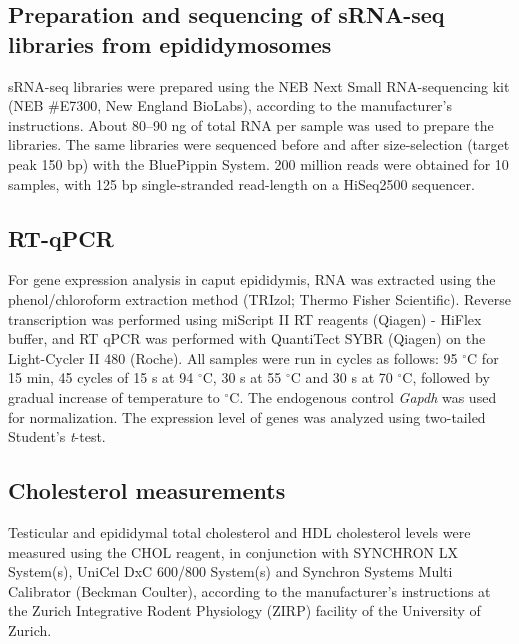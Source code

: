 \documentclass[12pt,twoside]{reedthesis}
\begin{document}
\hypertarget{preparation-and-sequencing-of-srna-seq-libraries-from-epididymosomes}{%
\subsection{Preparation and sequencing of sRNA-seq libraries from epididymosomes}\label{preparation-and-sequencing-of-srna-seq-libraries-from-epididymosomes}}

sRNA-seq libraries were prepared using the NEB Next Small RNA-sequencing
kit (NEB \#E7300, New England BioLabs), according to the manufacturer's
instructions. About 80--90 ng of total RNA per sample was used to
prepare the libraries. The same libraries were sequenced before and
after size-selection (target peak 150 bp) with the BluePippin System.
200 million reads were obtained for 10 samples, with 125 bp
single-stranded read-length on a HiSeq2500 sequencer.

\hypertarget{rt-qpcr}{%
\subsection{RT-qPCR}\label{rt-qpcr}}

For gene expression analysis in caput epididymis, RNA was extracted
using the phenol/chloroform extraction method (TRIzol; Thermo Fisher
Scientific). Reverse transcription was performed using miScript \RN{2}
RT reagents (Qiagen) - HiFlex buffer, and RT qPCR was performed with
QuantiTect SYBR (Qiagen) on the Light-Cycler \RN{2} 480 (Roche). All
samples were run in cycles as follows: 95 \(^{\circ}\)C for 15 min, 45
cycles of 15 s at 94 \(^{\circ}\)C, 30 s at 55 \(^{\circ}\)C and 30 s at 70
\(^{\circ}\)C, followed by gradual increase of temperature to \(^{\circ}\)C.
The endogenous control \textit{Gapdh} was used for normalization. The
expression level of genes was analyzed using two-tailed Student's
\textit{t}-test.

\hypertarget{cholesterol-measurements}{%
\subsection{Cholesterol measurements}\label{cholesterol-measurements}}

Testicular and epididymal total cholesterol and HDL cholesterol levels
were measured using the CHOL reagent, in conjunction with SYNCHRON LX
System(s), UniCel DxC 600/800 System(s) and Synchron Systems Multi
Calibrator (Beckman Coulter), according to the manufacturer's
instructions at the Zurich Integrative Rodent Physiology (ZIRP) facility
of the University of Zurich.
\end{document}
